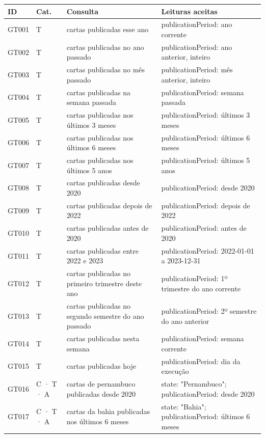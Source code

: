 {\footnotesize
\begin{longtable}{|p{1.1cm}|p{1.3cm}|p{5.4cm}|p{6.3cm}|}
\hline
\textbf{ID} & \textbf{Cat.} & \textbf{Consulta} & \textbf{Leituras aceitas} \\ \hline
\endhead
GT001 & T & cartas publicadas esse ano & publicationPeriod: ano corrente \\ \hline
GT002 & T & cartas publicadas no ano passado & publicationPeriod: ano anterior, inteiro \\ \hline
GT003 & T & cartas publicadas no mês passado & publicationPeriod: mês anterior, inteiro \\ \hline
GT004 & T & cartas publicadas na semana passada & publicationPeriod: semana passada \\ \hline
GT005 & T & cartas publicadas nos últimos 3 meses & publicationPeriod: últimos 3 meses \\ \hline
GT006 & T & cartas publicadas nos últimos 6 meses & publicationPeriod: últimos 6 meses \\ \hline
GT007 & T & cartas publicadas nos últimos 5 anos & publicationPeriod: últimos 5 anos \\ \hline
GT008 & T & cartas publicadas desde 2020 & publicationPeriod: desde 2020 \\ \hline
GT009 & T & cartas publicadas depois de 2022 & publicationPeriod: depois de 2022 \\ \hline
GT010 & T & cartas publicadas antes de 2020 & publicationPeriod: antes de 2020 \\ \hline
GT011 & T & cartas publicadas entre 2022 e 2023 & publicationPeriod: 2022-01-01 a 2023-12-31 \\ \hline
GT012 & T & cartas publicadas no primeiro trimestre deste ano & publicationPeriod: 1º trimestre do ano corrente \\ \hline
GT013 & T & cartas publicadas no segundo semestre do ano passado & publicationPeriod: 2º semestre do ano anterior \\ \hline
GT014 & T & cartas publicadas nesta semana & publicationPeriod: semana corrente \\ \hline
GT015 & T & cartas publicadas hoje & publicationPeriod: dia da execução \\ \hline
GT016 & C · T · A & cartas de pernambuco publicadas desde 2020 & state: "Pernambuco"; publicationPeriod: desde 2020 \\ \hline
GT017 & C · T · A & cartas da bahia publicadas nos últimos 6 meses & state: "Bahia"; publicationPeriod: últimos 6 meses \\ \hline

\end{longtable}}
